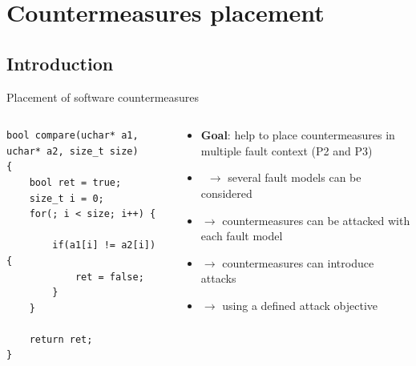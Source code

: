 \section{Countermeasures placement}

\subsection{Introduction}

\begin{frame}[fragile]{Placement of software countermeasures}
    \begin{columns}
        \begin{column}{0.55\textwidth}    
            \begin{lstlisting}
bool compare(uchar* a1, uchar* a2, size_t size)
{
    bool ret = true;
    size_t i = 0; 
    for(; i < size; i++) {
        
        if(a1[i] != a2[i]) {
            ret = false;
        }
    }
        
    return ret;
}
            \end{lstlisting}	
            \vfill
        \end{column}
        \begin{column}{0.55\textwidth}
            \begin{small}
                \begin{itemize}
                    \item \textbf{Goal}: help to place countermeasures in multiple fault context (P2 and P3)
                    \item[] $\rightarrow$ several fault models can be considered
                    \item[] $\rightarrow$ countermeasures can be attacked with each fault model
                    \item[] $\rightarrow$ countermeasures can introduce attacks
                    \item[] $\rightarrow$ using a defined attack objective
                \end{itemize}
            \end{small}
        \vfill
        \end{column}
    \end{columns}
\end{frame}

